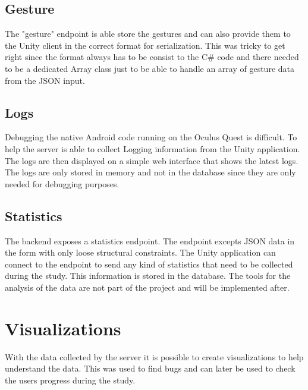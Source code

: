 \subsection{Gesture}
The "gesture" endpoint is able store the gestures and can also provide them to the Unity client in the correct format for serialization. This was tricky to get right since the format always has to be consist to the C# code and there needed to be a dedicated Array class just to be able to handle an array of gesture data from the JSON input.

\subsection{Logs}
Debugging the native Android code running on the Oculus Quest is difficult. To help the server is able to collect Logging information from the Unity application. The logs are then displayed on a simple web interface that shows the latest logs. The logs are only stored in memory and not in the database since they are only needed for debugging purposes. 

\subsection{Statistics}
The backend exposes a statistics endpoint. The endpoint excepts JSON data in the form with only loose structural constraints. The Unity application can connect to the endpoint to send any kind of statistics that need to be collected during the study. This information is stored in the database. The tools for the analysis of the data are not part of the project and will be implemented after.  


\section{Visualizations}
With the data collected by the server it is possible to create visualizations to help understand the data. This was used to find bugs and can later be used to check the users progress during the study.

